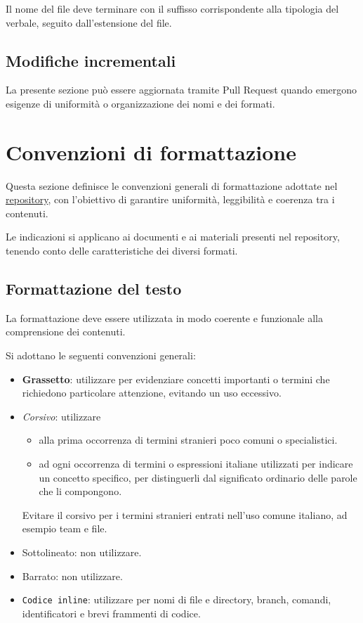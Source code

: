 \documentclass[11pt, a4paper]{article}
\begin{document}
\noindent Il nome del file deve terminare con il suffisso corrispondente alla tipologia del verbale, seguito dall'estensione del file.

\subsection{Modifiche incrementali}

La presente sezione può essere aggiornata tramite Pull Request quando emergono esigenze di uniformità o organizzazione dei nomi e dei formati.

\section{Convenzioni di formattazione}

Questa sezione definisce le convenzioni generali di formattazione adottate nel \href{https://github.com/On-By-One-Team/On-By-One.github.io}{repository}, con l'obiettivo di garantire uniformità, leggibilità e coerenza tra i contenuti.

Le indicazioni si applicano ai documenti e ai materiali presenti nel repository, tenendo conto delle caratteristiche dei diversi formati.

\subsection{Formattazione del testo}
\label{subsec:formattazione-del-testo}

La formattazione deve essere utilizzata in modo coerente e funzionale alla comprensione dei contenuti.

Si adottano le seguenti convenzioni generali:
\begin{itemize}
    \item \textbf{Grassetto}: utilizzare per evidenziare concetti importanti o termini che richiedono particolare attenzione, evitando un uso eccessivo.
    \item \textit{Corsivo}: utilizzare
    \begin{itemize}
        \item alla prima occorrenza di termini stranieri poco comuni o specialistici.
        \item ad ogni occorrenza di termini o espressioni italiane utilizzati per indicare un concetto specifico, per distinguerli dal significato ordinario delle parole che li compongono.
    \end{itemize}

    \noindent Evitare il corsivo per i termini stranieri entrati nell'uso comune italiano, ad esempio team e file.
    \item Sottolineato: non utilizzare.
    \item Barrato: non utilizzare.
    \item \texttt{Codice inline}: utilizzare per nomi di file e directory, branch, comandi, identificatori e brevi frammenti di codice.
\end{itemize}
\end{document}

